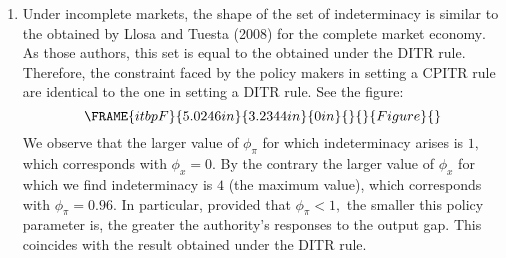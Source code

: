\documentclass{article}
\begin{document}
\begin{enumerate}
\item Under incomplete markets, the shape of the set of indeterminacy is
similar to the obtained by Llosa and Tuesta (2008) for the complete market
economy$.$ As those authors, this set is equal to the obtained under the
DITR rule. Therefore, the constraint faced by the policy makers in setting a
CPITR rule are identical to the one in setting a DITR rule. See the figure:%
\begin{equation*}
\FRAME{itbpF}{5.0246in}{3.2344in}{0in}{}{}{Figure}{\special{language
"Scientific Word";type "GRAPHIC";maintain-aspect-ratio TRUE;display
"USEDEF";valid_file "T";width 5.0246in;height 3.2344in;depth
0in;original-width 11.1042in;original-height 7.1252in;cropleft "0";croptop
"1";cropright "1";cropbottom "0";tempfilename
'L5F7A400.wmf';tempfile-properties "XPR";}}
\end{equation*}%
We observe that the larger value of $\phi _{\pi }$ for which indeterminacy
arises is $1,$ which corresponds with $\phi _{x}=0.$ By the contrary the
larger value of $\phi _{x}$ for which we find indeterminacy is $4$ (the
maximum value), which corresponds with $\phi _{\pi }=0.96.$ In particular,
provided that $\phi _{\pi }<1,$ the smaller this policy parameter is, the
greater the authority's responses to the output gap. This coincides with the
result obtained under the DITR rule.


\end{enumerate}
\end{document}
